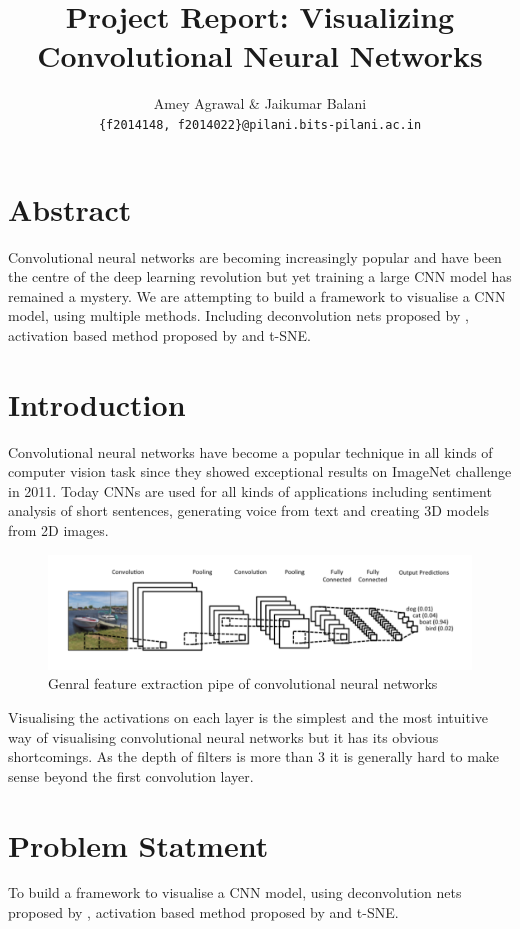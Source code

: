 \documentclass{article} %
\title{ Project Report: Visualizing Convolutional Neural
Networks }
\author{
Amey Agrawal \& Jaikumar Balani \\
\texttt{\{f2014148, f2014022\}@pilani.bits-pilani.ac.in} \\
}
\begin{document}
\maketitle

\section{Abstract}

Convolutional neural networks are becoming increasingly popular and have been
the centre of the deep learning revolution but yet training a large CNN model
has remained a mystery. We are attempting to build a framework to visualise a CNN model,
using multiple methods. Including deconvolution nets
proposed by \citet{zeiler2014visualizing}, activation based method
proposed by \citet{erhan2009visualizing} and t-SNE.

\section{Introduction}
Convolutional neural networks have become a popular technique in all kinds of
computer vision task since they showed exceptional results on ImageNet challenge
in 2011. Today CNNs are used for all kinds of applications including sentiment analysis
of short sentences, generating voice from text and creating 3D models from 2D images.

\begin{figure}[h]
  \begin{center}
  \includegraphics[width=\linewidth]{conv.png}
  \end{center}
  \caption{Genral feature extraction pipe of convolutional neural networks}
\end{figure}

Visualising the activations on each layer is the simplest and the most
intuitive way of visualising convolutional neural networks but it has its
obvious shortcomings. As the depth of filters is more than 3 it is generally
hard to make sense beyond the first convolution layer.

\section{Problem Statment}
To build a framework to visualise a CNN model,
using deconvolution nets
proposed by \citet{zeiler2014visualizing}, activation based method
proposed by \citet{erhan2009visualizing} and t-SNE.
\end{document}
